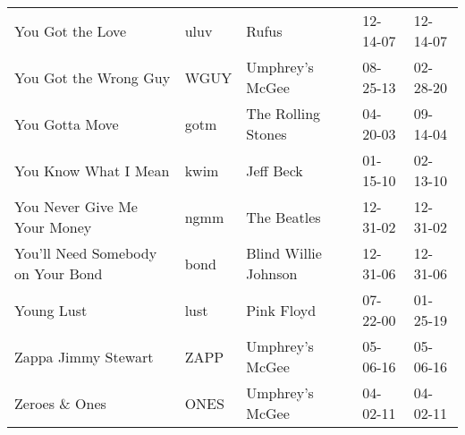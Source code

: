 \begin{longtable}{p{}p{}p{}p{}p{}}
                                                        You Got the Love &          uluv &                                                    Rufus &              12-14-07 &             12-14-07 \\
                                                   You Got the Wrong Guy &          WGUY &                                          Umphrey's McGee &              08-25-13 &             02-28-20 \\
                                                          You Gotta Move &          gotm &                                       The Rolling Stones &              04-20-03 &             09-14-04 \\
                                                    You Know What I Mean &          kwim &                                                Jeff Beck &              01-15-10 &             02-13-10 \\
                                            You Never Give Me Your Money &          ngmm &                                              The Beatles &              12-31-02 &             12-31-02 \\
                                       You'll Need Somebody on Your Bond &          bond &                                     Blind Willie Johnson &              12-31-06 &             12-31-06 \\
                                                              Young Lust &          lust &                                               Pink Floyd &              07-22-00 &             01-25-19 \\
                                                     Zappa Jimmy Stewart &          ZAPP &                                          Umphrey's McGee &              05-06-16 &             05-06-16 \\
                                                          Zeroes \& Ones &          ONES &                                          Umphrey's McGee &              04-02-11 &             04-02-11 \\
\end{longtable}
